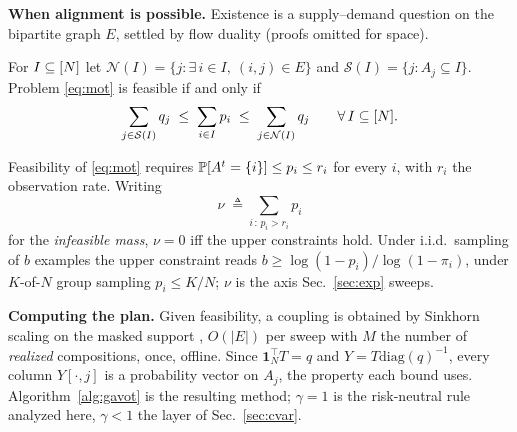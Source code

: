 \noindent\textbf{When alignment is possible.}
Existence is a supply--demand question on the bipartite graph $E$, settled
by flow duality \cite{hall1935,fordfulkerson1956} (proofs omitted for space).

\begin{theorem}
\label{thm:feas}
For $I\subseteq[N]$ let $\mathcal{N}(I)=\{j:\exists\,i\in I,\ (i,j)\in E\}$
and $\mathcal{S}(I)=\{j: A_j\subseteq I\}$. Problem \eqref{eq:mot} is feasible
if and only if
\begin{equation}
\sum_{j\in\mathcal{S}(I)}q_j\;\le\;\sum_{i\in I}p_i\;\le\;\sum_{j\in\mathcal{N}(I)}q_j
\qquad\forall\,I\subseteq[N].
\label{eq:hall}
\end{equation}
\end{theorem}

\begin{corollary}
\label{cor:batchsize}
Feasibility of \eqref{eq:mot} requires $\mathbb{P}[A^t=\{i\}]\le p_i\le r_i$ for every
$i$, with $r_i$ the observation rate. Writing
\begin{equation}
\nu\;\triangleq\!\!\sum_{i\,:\,p_i>r_i}\!\! p_i
\label{eq:batchlaw}
\end{equation}
for the \emph{infeasible mass}, $\nu=0$ iff the upper constraints hold.
Under i.i.d.\ sampling of $b$ examples the upper constraint reads
$b\ge\log(1-p_i)/\log(1-\pi_i)$, under $K$-of-$N$ group sampling
$p_i\le K/N$; $\nu$ is the axis Sec.~\ref{sec:exp} sweeps.
\end{corollary}

\noindent\textbf{Computing the plan.}
Given feasibility, a coupling is obtained by Sinkhorn scaling on the masked
support \cite{sinkhorn1967,cuturi2013,peyre2019},
$O(|E|)$ per sweep with $M$ the number of \emph{realized} compositions,
once, offline. Since $\mathbf{1}_N^\top T=q$ and $Y=T\mathrm{diag}(q)^{-1}$, every
column $Y[\cdot,j]$ is a probability vector on $A_j$, the property each
bound uses. Algorithm~\ref{alg:gavot} is the resulting method; $\gamma=1$ is
the risk-neutral rule analyzed here, $\gamma<1$ the layer of Sec.~\ref{sec:cvar}.

